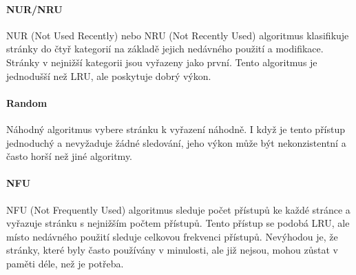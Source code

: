 \paragraph{NUR/NRU}
NUR (Not Used Recently) nebo NRU (Not Recently Used) algoritmus klasifikuje stránky do čtyř kategorií na základě jejich nedávného použití a modifikace. Stránky v nejnižší kategorii jsou vyřazeny jako první. Tento algoritmus je jednodušší než LRU, ale poskytuje dobrý výkon.

\paragraph{Random}
Náhodný algoritmus vybere stránku k vyřazení náhodně. I když je tento přístup jednoduchý a nevyžaduje žádné sledování, jeho výkon může být nekonzistentní a často horší než jiné algoritmy.

\paragraph{NFU}
NFU (Not Frequently Used) algoritmus sleduje počet přístupů ke každé stránce a vyřazuje stránku s nejnižším počtem přístupů. Tento přístup se podobá LRU, ale místo nedávného použití sleduje celkovou frekvenci přístupů. Nevýhodou je, že stránky, které byly často používány v minulosti, ale již nejsou, mohou zůstat v paměti déle, než je potřeba.







